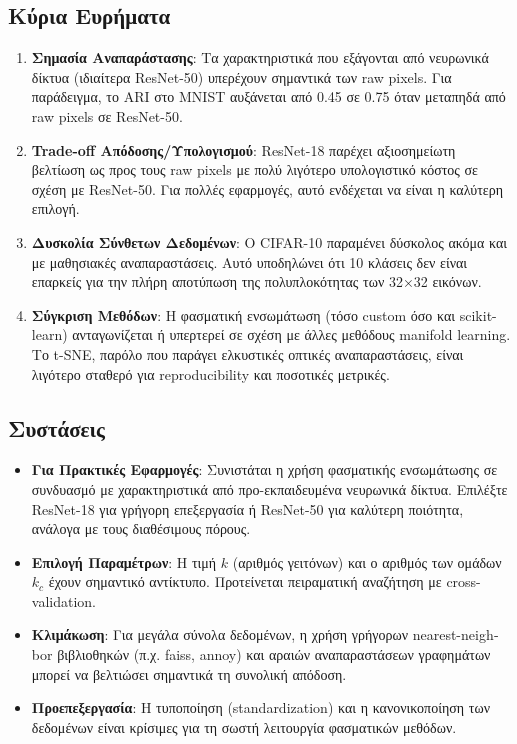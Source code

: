 \documentclass[a4paper,11pt]{article}
\newcommand{\lt}[1]{\foreignlanguage{english}{#1}}
\begin{document}
\subsection{Κύρια Ευρήματα}
\begin{enumerate}
  \item \textbf{Σημασία Αναπαράστασης}: Τα χαρακτηριστικά που εξάγονται από νευρωνικά δίκτυα (ιδιαίτερα \lt{ResNet-50}) υπερέχουν σημαντικά των raw pixels. Για παράδειγμα, το \lt{ARI} στο \lt{MNIST} αυξάνεται από 0.45 σε 0.75 όταν μεταπηδά από raw pixels σε \lt{ResNet-50}.
  
  \item \textbf{Trade-off Απόδοσης/Υπολογισμού}: \lt{ResNet-18} παρέχει αξιοσημείωτη βελτίωση ως προς τους raw pixels με πολύ λιγότερο υπολογιστικό κόστος σε σχέση με \lt{ResNet-50}. Για πολλές εφαρμογές, αυτό ενδέχεται να είναι η καλύτερη επιλογή.
  
  \item \textbf{Δυσκολία Σύνθετων Δεδομένων}: Ο \lt{CIFAR-10} παραμένει δύσκολος ακόμα και με μαθησιακές αναπαραστάσεις. Αυτό υποδηλώνει ότι 10 κλάσεις δεν είναι επαρκείς για την πλήρη αποτύπωση της πολυπλοκότητας των 32×32 εικόνων.
  
  \item \textbf{Σύγκριση Μεθόδων}: Η φασματική ενσωμάτωση (τόσο custom όσο και scikit-learn) ανταγωνίζεται ή υπερτερεί σε σχέση με άλλες μεθόδους manifold learning. Το \lt{t-SNE}, παρόλο που παράγει ελκυστικές οπτικές αναπαραστάσεις, είναι λιγότερο σταθερό για reproducibility και ποσοτικές μετρικές.
\end{enumerate}

\subsection{Συστάσεις}
\begin{itemize}
  \item \textbf{Για Πρακτικές Εφαρμογές}: Συνιστάται η χρήση φασματικής ενσωμάτωσης σε συνδυασμό με χαρακτηριστικά από προ-εκπαιδευμένα νευρωνικά δίκτυα. Επιλέξτε \lt{ResNet-18} για γρήγορη επεξεργασία ή \lt{ResNet-50} για καλύτερη ποιότητα, ανάλογα με τους διαθέσιμους πόρους.
  
  \item \textbf{Επιλογή Παραμέτρων}: Η τιμή $k$ (αριθμός γειτόνων) και ο αριθμός των ομάδων $k_c$ έχουν σημαντικό αντίκτυπο. Προτείνεται πειραματική αναζήτηση με cross-validation.
  
  \item \textbf{Κλιμάκωση}: Για μεγάλα σύνολα δεδομένων, η χρήση γρήγορων \lt{nearest-neighbor} βιβλιοθηκών (π.χ. \lt{faiss}, \lt{annoy}) και αραιών αναπαραστάσεων γραφημάτων μπορεί να βελτιώσει σημαντικά τη συνολική απόδοση.
  
  \item \textbf{Προεπεξεργασία}: Η τυποποίηση (standardization) και η κανονικοποίηση των δεδομένων είναι κρίσιμες για τη σωστή λειτουργία φασματικών μεθόδων.
\end{itemize}
\end{document}

